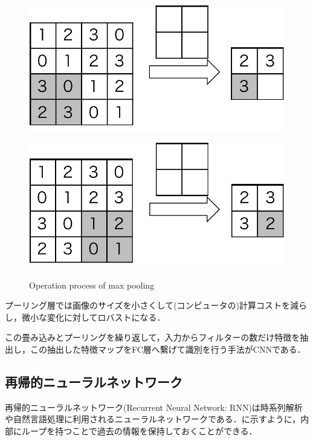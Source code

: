 \begin{figure}[H]
\begin{minipage}[b]{0.4\columnwidth}
		\subcaption{}
		\label{fig:pooling_ex2}
	\end{minipage}
	\begin{minipage}[b]{0.4\columnwidth}
		\centering
		\includegraphics[width=\linewidth]{fig/pooling_ex3}
		\subcaption{}
		\label{fig:pooling_ex3}
	\end{minipage}
	\hspace{10truemm}
	\begin{minipage}[b]{0.4\columnwidth}
		\centering
		\includegraphics[width=\linewidth]{fig/pooling_ex4}
		\subcaption{}
		\label{fig:pooling_ex4}
	\end{minipage}
	\caption{Operation process of max pooling}
	\label{fig:maxpooling}
\end{figure}

プーリング層では画像のサイズを小さくして(コンピュータの)計算コストを減らし，微小な変化に対してロバストになる．

この畳み込みとプーリングを繰り返して，入力からフィルターの数だけ特徴を抽出し，この抽出した特徴マップをFC層へ繋げて識別を行う手法がCNNである．


\subsection{再帰的ニューラルネットワーク}
再帰的ニューラルネットワーク(Recurrent Neural Network: RNN)は時系列解析や自然言語処理に利用されるニューラルネットワークである．に示すように，内部にループを持つことで過去の情報を保持しておくことができる．

